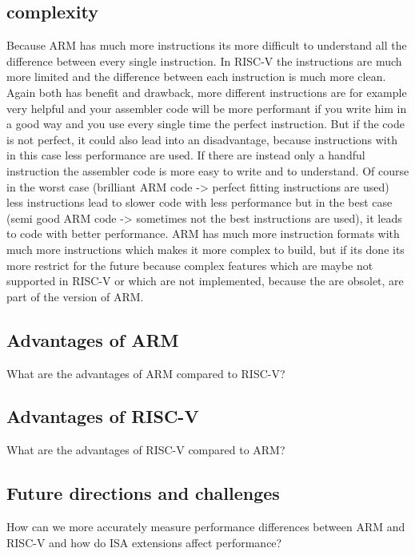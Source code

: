\documentclass[conference]{IEEEtran}
\begin{document}
	\subsection{complexity}
	Because ARM has much more instructions its more difficult to understand all the difference between every single instruction. In RISC-V the instructions are much more limited and the difference between each instruction is much more clean. Again both has benefit and drawback, more different instructions are for example very helpful and your assembler code will be more performant if you write him in a good way and you use every single time the perfect instruction. But if the code is not perfect, it could also lead into an disadvantage, because instructions with in this case less performance are used. If there are instead only a handful instruction the assembler code is more easy to write and to understand. Of course in the worst case (brilliant ARM code -> perfect fitting instructions are used) less instructions lead to slower code with less performance but in the best case (semi good ARM code -> sometimes not the best instructions are used), it leads to code with better performance. 
	ARM has much more instruction formats with much more instructions which makes it more complex to build, but if its done its more restrict for the future because complex features which are maybe not supported in RISC-V or which are not implemented, because the are obsolet, are part of the version of ARM.
	\subsection{Advantages of ARM}
	What are the advantages of ARM compared to RISC-V?
	\subsection{Advantages of RISC-V}
	What are the advantages of RISC-V compared to ARM?
	\subsection{Future directions and challenges}
	How can we more accurately measure performance differences between ARM and RISC-V and how do ISA extensions affect performance?
\end{document}
